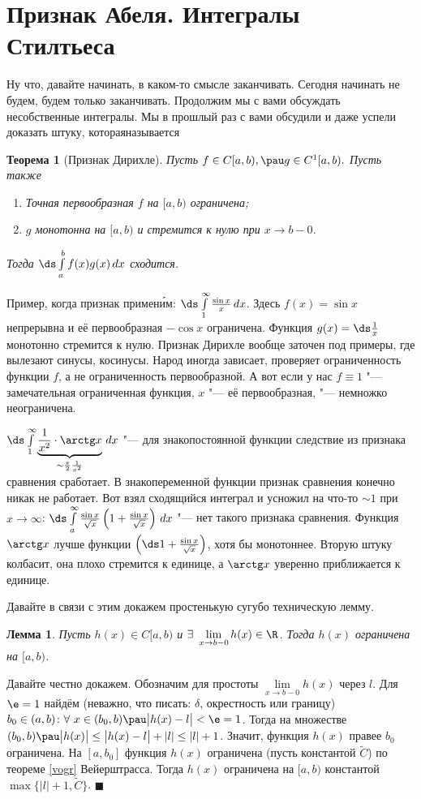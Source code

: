 \documentclass[a4paper,10pt,twoside]{article}
\newtheorem{Th}{Лемма}[section]
\newtheorem{The}{Теорема}[section]
\newenvironment{Proof}
       {\par\noindent{\textbf{Доказательство.}}}
       {\hfill$\scriptstyle\blacksquare$}
\let\AVsection\section{}
\renewcommand\section{\newpage\scol\AVsection}
\newcommand{\scol}{  \renewcommand{\headrulewidth}{0.5pt}\fancyhead[RE,LO]{\thesection{} \leftmark} \fancyhead[LE,RO]{\thepage}}
\begin{document}
	\section{Признак Абеля. Интегралы Стилтьеса}
	Ну что, давайте начинать, в каком-то смысле заканчивать. Сегодня начинать не будем, будем только заканчивать. Продолжим мы с вами обсуждать несобственные интегралы.
	Мы в прошлый раз с вами обсудили и даже успели доказать штуку, котораяназывается
	\begin{The}[Признак Дирихле]
	Пусть $f\in C[a,b),\pau g\in C^1[a,b).$ Пусть также
	\begin{enumerate}
	  \item Точная первообразная $f$ на $[a,b)$ ограничена;
	  \item $g$ монотонна на $[a,b)$ и стремится к нулю при $x\to b-0$.
	\end{enumerate}
	Тогда $\ds\int\limits_a^bf(x)g(x)\,dx$ сходится.
	\end{The}
	Пример, когда признак примен\'{и}м: $\ds\int\limits_1^\infty\frac{\sin x}x\,dx$. Здесь $f(x)=\sin x$ непрерывна и её первообразная $-\cos x$ 
	ограничена. Функция $g(x)=\ds\frac1x$ монотонно стремится к нулю. Признак Дирихле вообще заточен под примеры, где вылезают синусы, косинусы.
	Народ иногда зависает, проверяет ограниченность функции $f$, а не ограниченность первообразной. А вот если у нас $f\equiv 1$ "---
	замечательная ограниченная функция, $x$ "--- её первообразная, "--- немножко неограничена.
	
	$\ds\int\limits_1^\infty\underbrace{\frac1{x^2}\cdot\arctg x}_{\sim\frac{\pi}2\frac1{x^2}}\,dx$ "--- для знакопостоянной функции следствие из признака сравнения сработает.
	В знакопеременной функции признак сравнения конечно никак не работает. Вот взял сходящийся интеграл и усножил на что-то $\sim 1$ при $x\to \infty$:
	$\ds\int\limits_a^\infty\frac{\sin x}{\sqrt x}\left(1+\frac{\sin x}{\sqrt x}\right)\,dx$ "--- нет такого признака сравнения. Функция
	$\arctg x$ лучше функции $\left(\ds1+\frac{\sin x}{\sqrt x}\right)$, хотя бы монотоннее. Вторую штуку колбасит, она плохо стремится к единице, а 
	$\arctg x$ уверенно приближается к единице. 
	
	Давайте в связи с этим докажем простенькую сугубо техническую лемму.
	\begin{Th}
		Пусть $h(x)\in C[a,b)$ и $\exists\ \lim\limits_{x\to b-0}h(x)\in\R$. Тогда $h(x)$ ограничена на $[a,b)$.
	\end{Th}
	\begin{Proof}
	Давайте честно докажем. Обозначим для простоты $\lim\limits_{x\to b-0}h(x)$ через $l$. Для $\e=1$ найдём (неважно, что писать: $\delta$, окрестность или границу) $b_0\in(a,b)\colon 
	\forall\  x\in(b_0,b)\pau \big|h(x)-l\big|<\e=1$. Тогда на множестве $(b_0,b)\pau \big|h(x)\big|\leq\big|h(x)-l\big|+|l|\leq|l|+1$. Значит,
	функция $h(x)$ правее $b_0$ ограничена. На $[a,b_0]$ функция $h(x)$ ограничена (пусть константой $\widetilde C$) по теореме \ref{vogr} Вейерштрасса.
	Тогда $h(x)$ ограничена на $[a,b)$ константой $\max\big\{|l|+1,\widetilde C\big\}$.
	\end{Proof}
	
\end{document}
